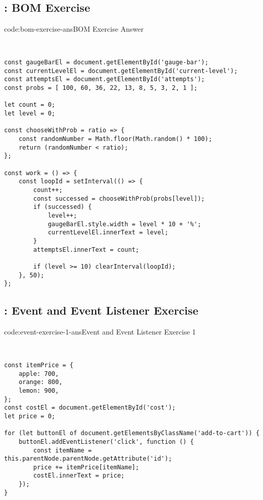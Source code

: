 \subsection*{: BOM Exercise}

\begin{codeenv}{code:bom-exercise-ans}{BOM Exercise Answer}\begin{verbatim}


const gaugeBarEl = document.getElementById('gauge-bar');
const currentLevelEl = document.getElementById('current-level');
const attemptsEl = document.getElementById('attempts');
const probs = [ 100, 60, 36, 22, 13, 8, 5, 3, 2, 1 ];

let count = 0;
let level = 0;

const chooseWithProb = ratio => {
    const randomNumber = Math.floor(Math.random() * 100);
    return (randomNumber < ratio);
};

const work = () => {
    const loopId = setInterval(() => {
        count++;
        const successed = chooseWithProb(probs[level]);
        if (successed) {
            level++;
            gaugeBarEl.style.width = level * 10 + '%';
            currentLevelEl.innerText = level;
        }
        attemptsEl.innerText = count;

        if (level >= 10) clearInterval(loopId);
    }, 50);
};
\end{verbatim}
\end{codeenv}

\subsection*{: Event and Event Listener Exercise}

\begin{codeenv}{code:event-exercise-1-ans}{Event and Event Listener Exercise 1}\begin{verbatim}


const itemPrice = {
    apple: 700, 
    orange: 800, 
    lemon: 900, 
};
const costEl = document.getElementById('cost');
let price = 0;

for (let buttonEl of document.getElementsByClassName('add-to-cart')) {
    buttonEl.addEventListener('click', function () {
        const itemName = this.parentNode.parentNode.getAttribute('id');
        price += itemPrice[itemName];
        costEl.innerText = price;
    });
}
\end{verbatim}
\end{codeenv}
\pagebreak


